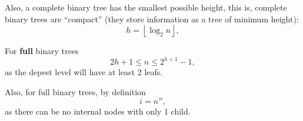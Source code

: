 Also, a complete binary tree has the smallest possible height,
this is, complete binary trees are ``compact''
(they store information as a tree of minimum height):
\begin{equation}
  h = \left \lfloor{\log_2 n}\right \rfloor,
\end{equation}

\separator

For \textbf{full} binary trees
\begin{equation}
  2h + 1 \le n \le 2^{h+1} - 1,
\end{equation}
as the depest level will have at least 2 leafs.

Also, for full binary trees, by definition
\begin{equation}
  i = n'',
\end{equation}
as there can be no internal nodes with only 1 child.

